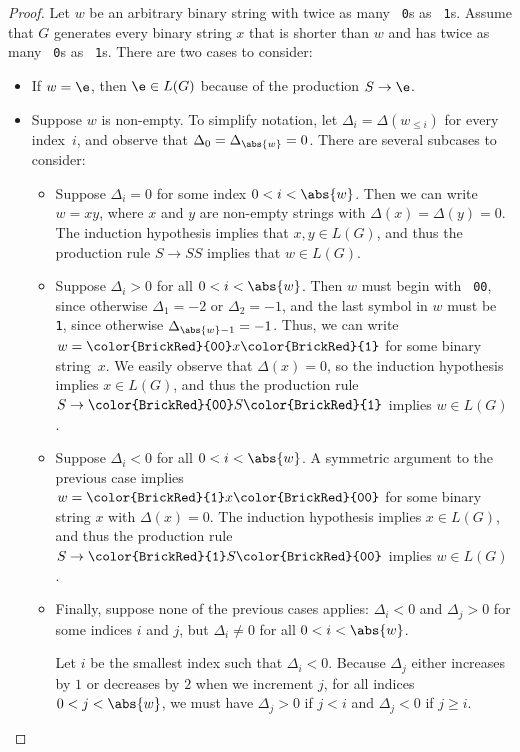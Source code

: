 \documentclass[11pt]{article}
\def\Sym#1{\texttt{\upshape \color{BrickRed} {#1}}}
\begin{document}
\begin{enumerate}
\begin{enumerate}
\begin{solution}
\begin{proof}
Let $w$ be an arbitrary binary string with twice as many \Sym0s as \Sym1s.  Assume that $G$ generates every  binary string $x$ that is shorter than $w$ and has twice as many \Sym0s as \Sym1s.  There are two cases to consider:

\begin{itemize}
\item
If $w = \e$, then $\e\in L(G)$ because of the production $S\to \e$.

\item
Suppose $w$ is non-empty.  To simplify notation, let $\Delta_i = \Delta(w_{\le i})$ for every index~$i$, and observe that $\Delta_0 = \Delta_{\abs{w}} = 0$.  There are several subcases to consider:

\begin{itemize}\parindent 1.5em
\item
Suppose $\Delta_i = 0$ for some index $0<i<\abs{w}$.  Then we can write $w = xy$, where $x$ and $y$ are non-empty strings with $\Delta(x)=\Delta(y) = 0$.  The induction hypothesis implies that $x,y\in L(G)$, and thus the production rule $S\to SS$ implies that $w\in L(G)$.

\item
Suppose $\Delta_i > 0$ for all $0<i<\abs{w}$.  Then $w$ must begin with \Sym{00}, since otherwise $\Delta_1 = -2$ or $\Delta_2 = -1$, and the last symbol in $w$ must be \Sym1, since otherwise $\Delta_{\abs{w}-1} = -1$.  Thus, we can write $w = \Sym{00}x\Sym1$ for some binary string~$x$.  We easily observe that $\Delta(x)=0$, so the induction hypothesis implies $x\in L(G)$, and thus the production rule $S\to \Sym{00}S\Sym1$ implies $w\in L(G)$.

\item
Suppose $\Delta_i < 0$ for all $0<i<\abs{w}$.  A symmetric argument to the previous case implies  $w = \Sym1x\Sym{00}$ for some binary string $x$ with $\Delta(x)=0$.  The induction hypothesis implies $x\in L(G)$, and thus the production rule $S\to \Sym1 S\Sym{00}$ implies $w\in L(G)$.

\item
Finally, suppose none of the previous cases applies: $\Delta_i<0$ and $\Delta_j>0$ for some indices $i$ and $j$, but $\Delta_i \ne 0$ for all $0<i<\abs{w}$.

Let $i$ be the smallest index such that $\Delta_i<0$.  Because $\Delta_j$ either increases by $1$ or decreases by $2$ when we increment $j$, for all indices $0<j<\abs{w}$, we must have $\Delta_j > 0$ if $j<i$ and $\Delta_j < 0$ if $j\ge i$.


\end{itemize}
\end{itemize}
\end{proof}
\end{solution}
\end{enumerate}
\end{enumerate}
\end{document}
